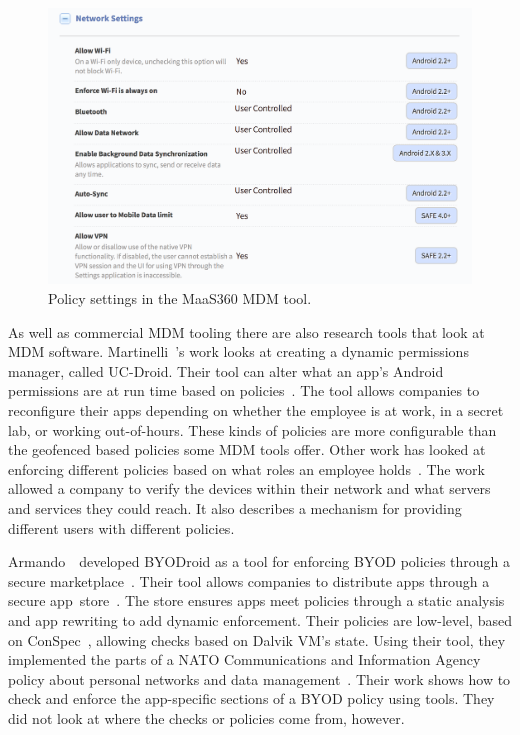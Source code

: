 \documentclass[thesis.tex]{subfiles}
\begin{document}
\begin{figure}
  \centering
  \includegraphics[width=\textwidth]{figures/maas360-policy.png}
  \caption{Policy settings in the MaaS360 \ac{MDM} tool.}
  \label{fig:maas360-policy}
\end{figure}

As well as commercial \ac{MDM} tooling there are also research tools that look
at \ac{MDM} software. Martinelli~\etal{}'s work looks at creating a dynamic
permissions manager, called UC-Droid. Their tool can alter what an app's Android
permissions are at run time based on policies~\cite{martinelli_enhancing_2016}.
The tool allows companies to reconfigure their apps depending on whether the
employee is at work, in a secret lab, or working out-of-hours. These kinds of
policies are more configurable than the geofenced based policies some \ac{MDM}
tools offer. Other work has looked at enforcing different policies based on
what roles an employee holds~\cite{costantino_towards_2013}. The work allowed a
company to verify the devices within their network and what servers and services
they could reach. It also describes a mechanism for providing different users
with different policies.

Armando~\etal~developed BYODroid as a tool for enforcing BYOD policies through a
secure marketplace~\cite{armando_bring_2013}. Their tool allows companies to
distribute apps through a secure app~store~\cite{armando_enabling_2014}. The
store ensures apps meet policies through a static analysis and
app rewriting to add dynamic enforcement. Their policies are low-level, based on
ConSpec~\cite{aktug_conspec_2008}, allowing checks based on Dalvik VM's state.
Using their tool, they implemented the parts of a NATO Communications and
Information Agency policy about personal networks and data
management~\cite{armando_developing_2016}. Their work shows how to check and enforce the app-specific
sections of a BYOD policy using tools. They did not
look at where the checks or policies come from, however.
\end{document}
